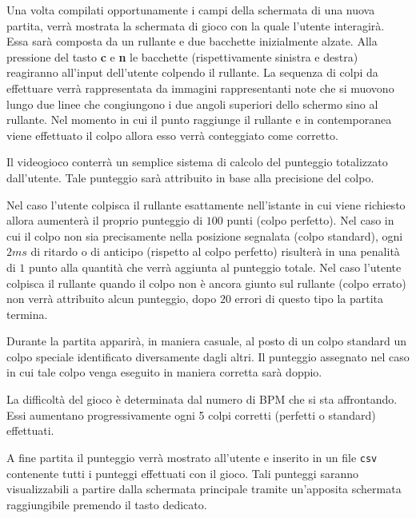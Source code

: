 Una volta compilati opportunamente i campi della schermata di una nuova partita, verrà mostrata la schermata di gioco con la quale l'utente interagirà.
Essa sarà composta da un rullante e due bacchette inizialmente alzate. Alla pressione del tasto \textbf{c} e \textbf{n} le bacchette (rispettivamente sinistra e destra) reagiranno all'input dell'utente colpendo il rullante.
La sequenza di colpi da effettuare verrà rappresentata da immagini rappresentanti note che si muovono lungo due linee che congiungono i due angoli superiori dello schermo sino al rullante.
Nel momento in cui il punto raggiunge il rullante e in contemporanea viene effettuato il colpo allora esso verrà conteggiato come corretto.

\medskip
Il videogioco conterrà un semplice sistema di calcolo del punteggio totalizzato dall'utente.
Tale punteggio sarà attribuito in base alla precisione del colpo.

Nel caso l'utente colpisca il rullante esattamente nell'istante in cui viene richiesto allora aumenterà il proprio punteggio di $100$ punti (colpo perfetto).
Nel caso in cui il colpo non sia precisamente nella posizione segnalata (colpo standard), ogni $2 ms$ di ritardo o di anticipo (rispetto al colpo perfetto) risulterà in una penalità di $1$ punto alla quantità che verrà aggiunta al punteggio totale.
Nel caso l'utente colpisca il rullante quando il colpo non è ancora giunto sul rullante (colpo errato) non verrà attribuito alcun punteggio, dopo $20$ errori di questo tipo la partita termina.

Durante la partita apparirà, in maniera casuale, al posto di un colpo standard un colpo speciale identificato diversamente dagli altri. Il punteggio assegnato nel caso in cui tale colpo venga eseguito in maniera corretta sarà doppio.

La difficoltà del gioco è determinata dal numero di BPM che si sta affrontando. Essi aumentano progressivamente ogni 5 colpi corretti (perfetti o standard) effettuati.

A fine partita il punteggio verrà mostrato all'utente e inserito in un file \texttt{csv} contenente tutti i punteggi effettuati con il gioco. Tali punteggi saranno visualizzabili a partire dalla schermata principale tramite un'apposita schermata raggiungibile premendo il tasto dedicato.